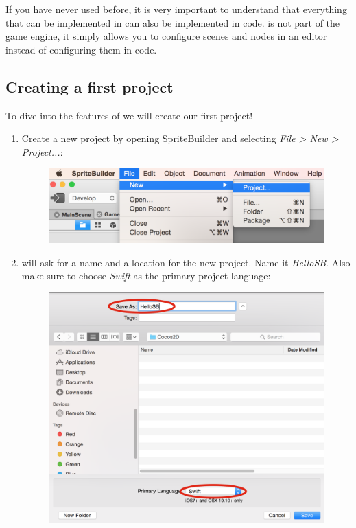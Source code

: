 If you have never used \SB{} before, it is very important to understand that
everything that can be implemented in \SB{} can also be implemented in code.
\SB{} is not part of the game engine, it simply allows you to configure \cocos{}
scenes and nodes in an editor instead of configuring them in code.

\subsection{Creating a first project}
To dive into the features of \SB{} we will create our first project! 

\begin{leftbar}
\begin{enumerate}
  \item Create a new project by opening SpriteBuilder and selecting \textit{File > New >
Project...}:
\begin{figure}[H]
    \centering
    \includegraphics[width=0.9\linewidth]{images/cocos2d/setup/spritebuilder_new_project.png}     
\end{figure}

  \item \SB{} will ask for a name and a location for the new project. Name it
\textit{HelloSB}. Also make sure to choose \textit{Swift} as the primary project
language:
\begin{figure}[H]
    \centering
    \includegraphics[width=0.9\linewidth]{images/Chapter1/new_project_swift.png}     
\end{figure} 
\end{enumerate}
\end{leftbar}

